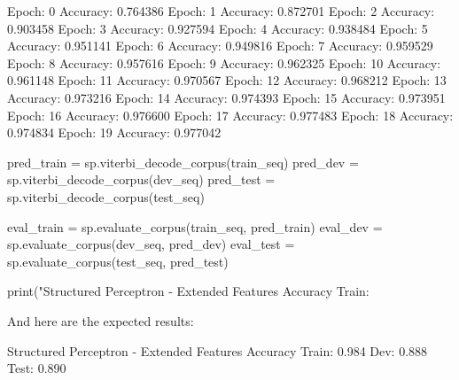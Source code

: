 \begin{exercise}
\begin{python}
Epoch: 0 Accuracy: 0.764386
Epoch: 1 Accuracy: 0.872701
Epoch: 2 Accuracy: 0.903458
Epoch: 3 Accuracy: 0.927594
Epoch: 4 Accuracy: 0.938484
Epoch: 5 Accuracy: 0.951141
Epoch: 6 Accuracy: 0.949816
Epoch: 7 Accuracy: 0.959529
Epoch: 8 Accuracy: 0.957616
Epoch: 9 Accuracy: 0.962325
Epoch: 10 Accuracy: 0.961148
Epoch: 11 Accuracy: 0.970567
Epoch: 12 Accuracy: 0.968212
Epoch: 13 Accuracy: 0.973216
Epoch: 14 Accuracy: 0.974393
Epoch: 15 Accuracy: 0.973951
Epoch: 16 Accuracy: 0.976600
Epoch: 17 Accuracy: 0.977483
Epoch: 18 Accuracy: 0.974834
Epoch: 19 Accuracy: 0.977042

pred_train = sp.viterbi_decode_corpus(train_seq)
pred_dev = sp.viterbi_decode_corpus(dev_seq)
pred_test = sp.viterbi_decode_corpus(test_seq)

eval_train = sp.evaluate_corpus(train_seq, pred_train)
eval_dev = sp.evaluate_corpus(dev_seq, pred_dev)
eval_test = sp.evaluate_corpus(test_seq, pred_test)

print("Structured Perceptron - Extended Features Accuracy Train: %
\end{python}

And here are the expected results:
\begin{python}
Structured Perceptron - Extended Features Accuracy Train: 0.984 Dev: 0.888 Test: 0.890
\end{python}

\end{exercise}





